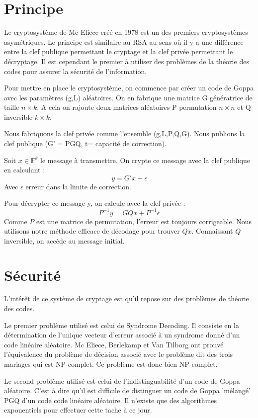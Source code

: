 \documentclass{article}
\begin{document}
		\section*{Principe}
			Le cryptosystème de Mc Eliece créé en 1978 est un des premiers cryptosystèmes asymétriques.
			Le principe est similaire au RSA au sens où il y a une différence entre la clef publique permettant le cryptage et la clef privée permettant le décryptage.
			Il est cependant le premier à utiliser des problèmes de la théorie des codes pour assurer la sécurité de l'information.

			Pour mettre en place le cryptosystème, on commence par créer un code de Goppa avec les paramètres (g,L) aléatoires.
			On en fabrique une matrice G génératrice de taille $n\times k$.
			A cela on rajoute deux matrices aléatoires P permutation $n\times n$ et Q inversible $k \times k$.

			Nous fabriquons la clef privée comme l'ensemble (g,L,P,Q,G).
			Nous publions la clef publique (G' = PGQ, t= capacité de correction).

			Soit $x\in \mathbb{F}^{k}$ le message à transmettre.
			On crypte ce message avec la clef publique en calculant :
			$$
				y = G'x + \epsilon
			$$
			Avec $\epsilon$ erreur dans la limite de correction.

			Pour décrypter ce message y, on calcule avec la clef privée :
			$$
				P^{-1}y = GQx + P^{-1}\epsilon
			$$
			Comme $P$ est une matrice de permutation, l'erreur est toujours corrigeable.
			Nous utilisons notre méthode efficace de décodage pour trouver $Qx$.
			Connaissant $Q$ inversible, on accède au message initial.


		\section*{Sécurité}
			 \cite{veron}
			 L'intérêt de ce système de cryptage est qu'il repose sur des problèmes de théorie des codes.

			 Le premier problème utilisé est celui de Syndrome Decoding.
			 Il consiste en la détermination de l'unique vecteur d'erreur associé à un syndrome donné d'un code linéaire aléatoire.
			 Mc Eliece, Berlekamp et Van Tilborg ont prouvé l'équivalence du problème de décision associé avec le problème dit des trois mariages qui est NP-complet.
			 Ce problème est donc bien NP-complet.

			 Le second problème utilisé est celui de l'indistinguabilité d'un code de Goppa aléatoire.
			 C'est à dire qu'il est difficile de distinguer un code de Goppa 'mélangé' PGQ d'un code code linéaire aléatoire.
			 Il n'existe que des algorithmes exponentiels pour effectuer cette tache à ce jour.
\end{document}
